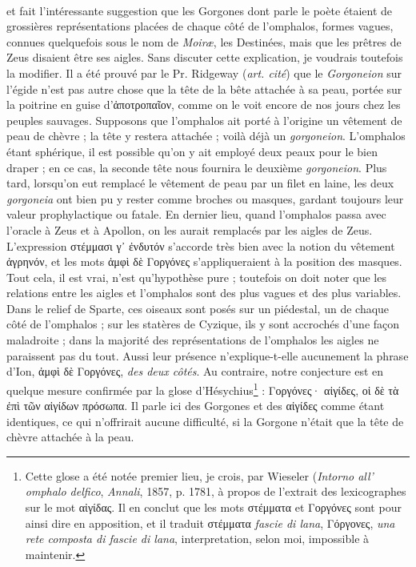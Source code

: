 \documentclass[a4paper, 11pt, oneside, polutonikogreek, french]{article}
\begin{document}
\paragraph{}
et fait l'intéressante suggestion que les Gorgones dont parle le poète étaient de grossières représentations placées de chaque côté de l'omphalos, formes vagues, connues quelquefois sous le nom de \emph{Moiræ}, les Destinées, mais que les prêtres de Zeus disaient être ses aigles. Sans discuter cette explication, je voudrais toutefois la modifier. Il a été prouvé par le Pr. Ridgeway (\emph{art. cité}) que le \emph{Gorgoneion} sur l'égide n'est pas autre chose que la tête de la bête attachée à sa peau, portée sur la poitrine en guise d'ἀποτροπαῖον, comme on le voit encore de nos jours chez les peuples sauvages. Supposons que l'omphalos ait porté à l'origine un vêtement de peau de chèvre ; la tête y restera attachée ; voilà déjà un \emph{gorgoneion}. L'omphalos étant sphérique, il est possible qu'on y ait employé deux peaux pour le bien draper ; en ce cas, la seconde tête nous fournira le deuxième \emph{gorgoneion}. Plus tard, lorsqu'on eut remplacé le vêtement de peau par un filet en laine, les deux \emph{gorgoneia} ont bien pu y rester comme broches ou masques, gardant toujours leur valeur prophylactique ou fatale. En dernier lieu, quand l'omphalos passa avec l'oracle à Zeus et à Apollon, on les aurait remplacés par les aigles de Zeus. L'expression στέμμασι γ᾽ ἐνδυτόν s'accorde très bien avec la notion du vêtement ἀγρηνόν, et les mots ἀμφὶ δὲ Γοργόνες s'appliqueraient à la position des masques. Tout cela, il est vrai, n'est qu'hypothèse pure ; toutefois on doit noter que les relations entre les aigles et l'omphalos sont des plus vagues et des plus variables. Dans le relief de Sparte, ces oiseaux sont posés sur un piédestal, un de chaque côté de l'omphalos ; sur les statères de Cyzique, ils y sont accrochés d'une façon maladroite ; dans la majorité des représentations de l'omphalos les aigles ne paraissent pas du tout. Aussi leur présence n'explique-t-elle aucunement la phrase d'Ion, ἀμφὶ δὲ Γοργόνες, \emph{des deux côtés}. Au contraire, notre conjecture est en quelque mesure confirmée par la glose d'Hésychius\footnote{Cette glose a été notée premier lieu, je crois, par Wieseler (\emph{Intorno all' omphalo delfico}, \emph{Annali}, 1857, p. 1781, à propos de l'extrait des lexicographes sur le mot αἰγίδας. Il en conclut que les mots στέμματα et Γοργόνες sont pour ainsi dire en apposition, et il traduit στέμματα \emph{fascie di lana}, Γόργονες, \emph{una rete composta di fascie di lana}, interpretation, selon moi, impossible à maintenir.} : Γοργόνες· αἰγίδες, οἱ δὲ τὰ ἐπὶ τῶν αἰγίδων πρόσωπα. Il parle ici des Gorgones et des αἰγίδες comme étant identiques, ce qui n'offrirait aucune difficulté, si la Gorgone n'était que la tête de chèvre attachée à la peau.
\end{document}
